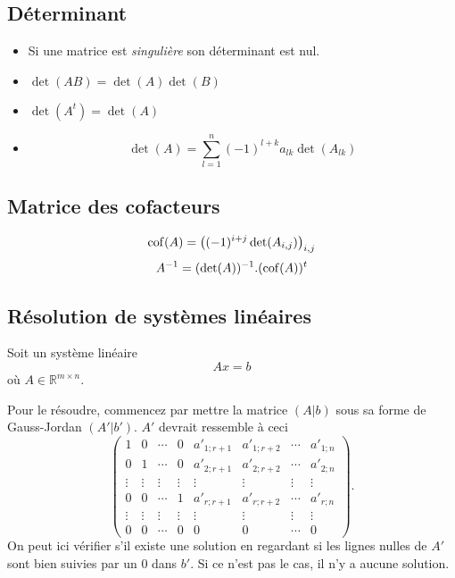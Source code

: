 \subsection{Déterminant}
\begin{itemize}
  \item Si une matrice est \emph{singulière} son déterminant est nul.
  \item $\det(AB) = \det(A) \det(B)$
  \item $\det(A^t) = \det(A)$
  \item \[ \det(A) = \sum_{l = 1}^{n}(-1)^{l+k}a_{lk}\det(A_{lk}) \]
\end{itemize}

\subsection{Matrice des cofacteurs}
\[ \operatorname{cof}(A) = \left((-1)^{i + j}\det(A_{i,j})\right)_{i,j} \]
\[ A^{-1} = (\det(A))^{-1} . (\operatorname{cof}(A))^t \]

\subsection{Résolution de systèmes linéaires}
\label{sec:solvelinsys}
Soit un système linéaire
\[ A x = b \]
où $A \in \mathbb{R}^{m \times n}$.

Pour le résoudre, commencez par mettre la matrice $(A|b)$
sous sa forme de Gauss-Jordan $(A'|b')$.
$A'$ devrait ressemble à ceci
\[ \begin{pmatrix}
    1 & 0 & \cdots & 0 & a'_{1;r+1} & a'_{1;r+2} & \cdots & a'_{1;n}\\
    0 & 1 & \cdots & 0 & a'_{2;r+1} & a'_{2;r+2} & \cdots & a'_{2;n}\\
    \vdots & \vdots & \vdots & \vdots &
    \vdots & \vdots & \vdots & \vdots\\
    0 & 0 & \cdots & 1 & a'_{r;r+1} & a'_{r;r+2} & \cdots & a'_{r;n}\\
    \vdots & \vdots & \vdots & \vdots &
    \vdots & \vdots & \vdots & \vdots\\
    0 & 0 & \cdots & 0 & 0 & 0 & \cdots & 0
\end{pmatrix}. \]
On peut ici vérifier s'il existe une solution en regardant si les lignes
nulles de $A'$ sont bien suivies par un 0 dans $b'$.
Si ce n'est pas le cas, il n'y a aucune solution.

